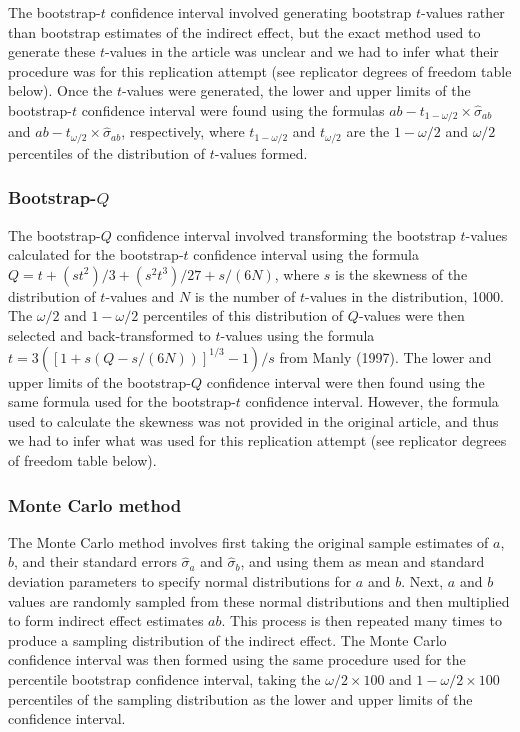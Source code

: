 \documentclass[10,a4paperpaper,]{article}
\begin{document}
The bootstrap-\(t\) confidence interval involved generating bootstrap
\(t\)-values rather than bootstrap estimates of the indirect effect, but
the exact method used to generate these \(t\)-values in the article was
unclear and we had to infer what their procedure was for this
replication attempt (see replicator degrees of freedom table below).
Once the \(t\)-values were generated, the lower and upper limits of the
bootstrap-\(t\) confidence interval were found using the formulas
\(ab - t_{1-\omega/2} \times \hat{\sigma}_{ab}\) and
\(ab - t_{\omega/2} \times \hat{\sigma}_{ab}\), respectively, where
\(t_{1-\omega/2}\) and \(t_{\omega/2}\) are the \(1-\omega/2\) and
\(\omega/2\) percentiles of the distribution of \(t\)-values formed.

\subsubsection{Bootstrap-$Q$}

The bootstrap-\(Q\) confidence interval involved transforming the
bootstrap \(t\)-values calculated for the bootstrap-\(t\) confidence
interval using the formula \(Q = t + (st^2)/3 + (s^2t^3)/27 + s/(6N)\),
where \(s\) is the skewness of the distribution of \(t\)-values and
\(N\) is the number of \(t\)-values in the distribution, 1000. The
\(\omega/2\) and \(1-\omega/2\) percentiles of this distribution of
\(Q\)-values were then selected and back-transformed to \(t\)-values
using the formula \(t = 3([1+s(Q - s/(6N))]^{1/3} - 1)/s\) from Manly
(1997). The lower and upper limits of the bootstrap-\(Q\) confidence
interval were then found using the same formula used for the
bootstrap-\(t\) confidence interval. However, the formula used to
calculate the skewness was not provided in the original article, and
thus we had to infer what was used for this replication attempt (see
replicator degrees of freedom table below).

\subsubsection{Monte Carlo method}

The Monte Carlo method involves first taking the original sample
estimates of \(a\), \(b\), and their standard errors \(\hat{\sigma}_a\)
and \(\hat{\sigma}_b\), and using them as mean and standard deviation
parameters to specify normal distributions for \(a\) and \(b\). Next,
\(a\) and \(b\) values are randomly sampled from these normal
distributions and then multiplied to form indirect effect estimates
\(ab\). This process is then repeated many times to produce a sampling
distribution of the indirect effect. The Monte Carlo confidence interval
was then formed using the same procedure used for the percentile
bootstrap confidence interval, taking the \(\omega/2 \times 100\) and
\(1- \omega/2 \times 100\) percentiles of the sampling distribution as
the lower and upper limits of the confidence interval.
\end{document}
